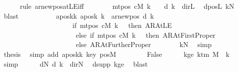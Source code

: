 \begin{isabellebody}
\ \ \ \ \isamarkupfalse%
\ {\isacharparenleft}{\kern0pt}rule\ ar{\isacharunderscore}{\kern0pt}newpos{\isacharunderscore}{\kern0pt}atLE{\isacharunderscore}{\kern0pt}iff{\isacharparenright}{\kern0pt}\isanewline
\ \ \ \ \ \ \isamarkupfalse%
\ {\isachardoublequoteopen}mt{\isacharunderscore}{\kern0pt}pos\ cM\ k\ {\isacharequal}{\kern0pt}\ {}\ {\isasymLongrightarrow}\ d\ k\ {\isasymnoteq}\ dir{\isachardot}{\kern0pt}L{\isachardoublequoteclose}\ \isamarkupfalse%
\ dposL\ kN\ \isamarkupfalse%
\ blast\isanewline
\ \ \ \ \isamarkupfalse%
\isanewline
\ \ \ \ \isamarkupfalse%
\ aposk{\isacharunderscore}{\kern0pt}k{\isacharcolon}{\kern0pt}\ {\isachardoublequoteopen}{\isacharquery}{\kern0pt}aposk\ k\ {\isacharequal}{\kern0pt}\ ar{\isacharunderscore}{\kern0pt}newpos\ {\isacharparenleft}{\kern0pt}d\ k{\isacharparenright}{\kern0pt}\isanewline
\ \ \ \ \ \ \ \ \ \ \ \ \ \ \ \ \ \ \ \ \ {\isacharparenleft}{\kern0pt}if\ mt{\isacharunderscore}{\kern0pt}pos\ cM\ k\ {\isacharequal}{\kern0pt}\ {}\ then\ AR{\isacharunderscore}{\kern0pt}AtLE\isanewline
\ \ \ \ \ \ \ \ \ \ \ \ \ \ \ \ \ \ \ \ \ \ else\ if\ mt{\isacharunderscore}{\kern0pt}pos\ cM\ k\ {\isacharequal}{\kern0pt}\ {}\ then\ AR{\isacharunderscore}{\kern0pt}AtFirstProper\isanewline
\ \ \ \ \ \ \ \ \ \ \ \ \ \ \ \ \ \ \ \ \ \ else\ AR{\isacharunderscore}{\kern0pt}AtFurtherProper{\isacharparenright}{\kern0pt}{\isachardoublequoteclose}\isanewline
\ \ \ \ \ \ \isamarkupfalse%
\ kN\ \isamarkupfalse%
\ simp\isanewline
\ \ \ \ \isamarkupfalse%
\ {\isacharquery}{\kern0pt}thesis\ \isamarkupfalse%
\ {\isacharparenleft}{\kern0pt}simp\ add{\isacharcolon}{\kern0pt}\ aposk{\isacharunderscore}{\kern0pt}k\ key\ posM{}{\isacharparenright}{\kern0pt}\isanewline
\ \ \isamarkupfalse%
\isanewline
\ \ \ \ \isamarkupfalse%
\ False\isanewline
\ \ \ \ \isamarkupfalse%
\ kge{\isacharcolon}{\kern0pt}\ {\isachardoublequoteopen}k{\isacharunderscore}{\kern0pt}tm\ M\ {\isasymle}\ k{\isachardoublequoteclose}\ \isamarkupfalse%
\ simp\isanewline
\ \ \ \ \isamarkupfalse%
\ dN{\isacharcolon}{\kern0pt}\ {\isachardoublequoteopen}d\ k\ {\isacharequal}{\kern0pt}\ dir{\isachardot}{\kern0pt}N{\isachardoublequoteclose}\ \isamarkupfalse%
\ dsupp\ kge\ \isamarkupfalse%
\ blast\isanewline

\end{isabellebody}
